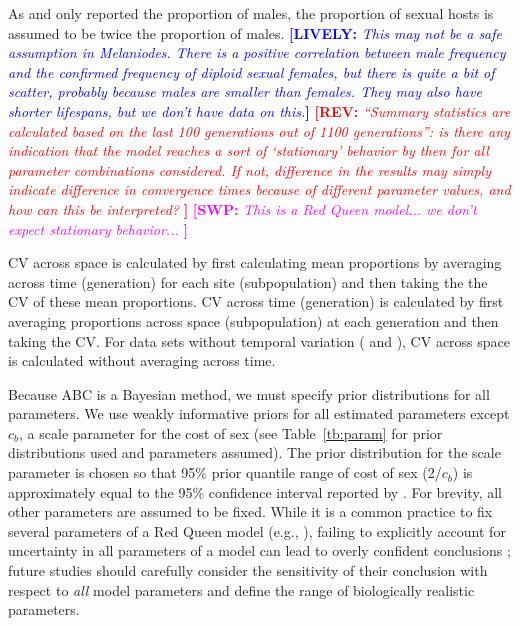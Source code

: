 \documentclass{article}\usepackage[]{graphicx}\usepackage[]{color}
\newcommand{\comment}[3]{\textcolor{#1}{\textbf{[#2: }\textit{#3}\textbf{]}}}
\newcommand{\swp}[1]{\comment{magenta}{SWP}{#1}}
\newcommand{\rev}[1]{\comment{red}{REV}{#1}}
\newcommand{\lively}[1]{\comment{blue}{LIVELY}{#1}}
\begin{document}
As \cite{dagan2013clonal} and \cite{mckone2016fine} only reported the proportion of males, the proportion of sexual hosts is assumed to be twice the proportion of males.
\lively{This may not be a safe assumption in Melaniodes.  
There is a positive correlation between male frequency and the confirmed frequency of diploid sexual females, but there is quite a bit of scatter, probably because males are smaller than females.  They may also have shorter lifespans, but we don't have data on this.}
\rev{
“Summary statistics are calculated based on the last 100 generations out of 1100 generations”: is there any indication that the model reaches a sort of ‘stationary’ behavior by then for all parameter combinations considered. If not, difference in the results may simply indicate difference in convergence times because of different parameter values, and how can this be interpreted?
}
\swp{
This is a Red Queen model... we don't expect stationary behavior...
}

CV across space is calculated by first calculating mean proportions by averaging across time (generation) for each site (subpopulation) and then taking the the CV of these mean proportions.
CV across time (generation) is calculated by first averaging proportions across space (subpopulation) at each generation and then taking the CV.
For data sets without temporal variation (\cite{dagan2013clonal} and \cite{mckone2016fine}), CV across space is calculated without averaging across time.

Because ABC is a Bayesian method, we must specify prior distributions for all parameters.
We use weakly informative priors for all estimated parameters except $c_b$, a scale parameter for the cost of sex (see Table~\ref{tb:param} for prior distributions used and parameters assumed).
The prior distribution for the scale parameter is chosen so that 95\% prior quantile range of cost of sex (2/$c_b$) is approximately equal to the 95\% confidence interval reported by \cite{gibson2017two}.
For brevity, all other parameters are assumed to be fixed.
While it is a common practice to fix several parameters of a Red Queen model (e.g., \cite{lively2010epidemiological,ashby2015diversity,haafke2016eco,ashby2019understanding}), failing to explicitly account for uncertainty in all parameters of a model can lead to overly confident conclusions \citep{elderd2006uncertainty};
future studies should carefully consider the sensitivity of their conclusion with respect to \emph{all} model parameters and define the range of biologically realistic parameters.
\end{document}
